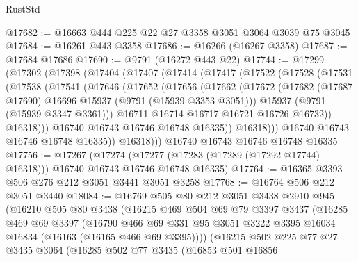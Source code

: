\begin{lexlean}{RustStd}
\begin{coremodule}
@17682 := @16663 @444 @225 @22 @27 @3358 @3051 @3064 @3039 @75 @3045
@17684 := @16261 @443 @3358
@17686 := @16266 (@16267 @3358)
@17687 := @17684 @17686
@17690 := @9791 (@16272 @443 @22)
@17744 := @17299
    (@17302
      (@17398
        (@17404
          (@17407
            (@17414
              (@17417
                (@17522
                  (@17528
                    (@17531
                      (@17538
                        (@17541
                          (@17646
                            (@17652
                              (@17656
                                (@17662
                                  (@17672
                                    (@17682
                                      (@17687 @17690)
                                      @16696
                                      @15937
                                      (@9791 (@15939 @3353 @3051)))
                                    @15937
                                    (@9791 (@15939 @3347 @3361)))
                                  @16711
                                  @16714
                                  @16717
                                  @16721
                                  @16726
                                  @16732))
                              @16318)))
                        @16740
                        @16743
                        @16746
                        @16748
                        @16335))
                    @16318)))
              @16740
              @16743
              @16746
              @16748
              @16335))
          @16318)))
    @16740
    @16743
    @16746
    @16748
    @16335
@17756 := @17267
    (@17274 (@17277 (@17283 (@17289 (@17292 @17744) @16318))) @16740 @16743 @16746 @16748 @16335)
@17764 := @16365 @3393 @506 @276 @212 @3051 @3441 @3051 @3258
@17768 := @16764 @506 @212 @3051 @3440
@18084 := @16769
    @505
    @80
    @212
    @3051
    @3438
    @2910
    @945
    (@16210
      @505
      @80
      @3438
      (@16215
        @469
        @504
        @69
        @79
        @3397
        @3437
        (@16285
          @469
          @69
          @3397
          (@16790
            @466
            @69
            @331
            @95
            @3051
            @3222
            @3395
            @16034
            @16834
            (@16163 (@16165 @466 @69 @3395))))
        (@16215
          @502
          @225
          @77
          @27
          @3435
          @3064
          (@16285
            @502
            @77
            @3435
            (@16853
              @501
              @16856

\end{coremodule}
\end{lexlean}
